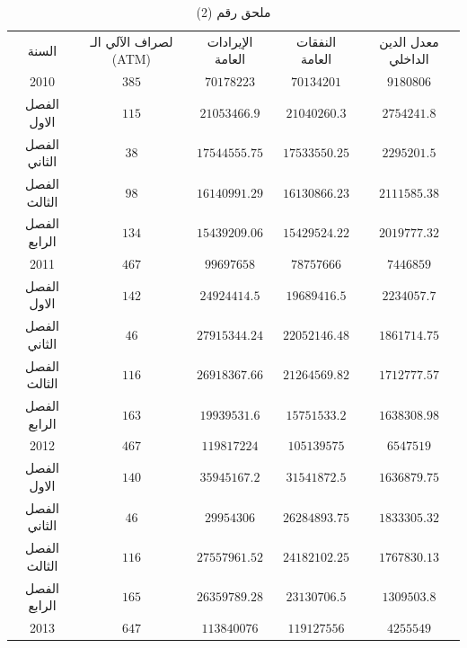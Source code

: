 \documentclass[10pt,a4paper]{report}
\begin{document}
	\begin{longtable}{|c|c|c|c|c|}
	\captionsetup{font=Large}
 \caption*{ملحق رقم (2)} \\
	\hline
\rowcolor[HTML]{DAE8FC} 
السنة        & لصراف الآلي الـ (ATM) & الإيرادات العامة & النفقات العامة & معدل الدين الداخلي \\ \hline
2010         & $385$                 & $70178223$       & $70134201$     & $9180806$          \\ \hline
الفصل الاول  & $115$                 & $21053466.9$     & $21040260.3$   & $2754241.8$        \\ \hline
الفصل الثاني & $38$                  & $17544555.75$    & $17533550.25$  & $2295201.5$        \\ \hline
الفصل الثالث & $98$                  & $16140991.29$    & $16130866.23$  & $2111585.38$       \\ \hline
الفصل الرابع & $134$                 & $15439209.06$    & $15429524.22$  & $2019777.32$       \\ \hline
2011         & $467$                 & $99697658$       & $78757666$     & $7446859$          \\ \hline
الفصل الاول  & $142$                 & $24924414.5$     & $19689416.5$   & $2234057.7$        \\ \hline
الفصل الثاني & $46$                  & $27915344.24$    & $22052146.48$  & $1861714.75$       \\ \hline
الفصل الثالث & $116$                 & $26918367.66$    & $21264569.82$  & $1712777.57$       \\ \hline
الفصل الرابع & $163$                 & $19939531.6$     & $15751533.2$   & $1638308.98$       \\ \hline
2012         & $467$                 & $119817224$      & $105139575$    & $6547519$          \\ \hline
الفصل الاول  & $140$                 & $35945167.2$     & $31541872.5$   & $1636879.75$       \\ \hline
الفصل الثاني & $46$                  & $29954306$       & $26284893.75$  & $1833305.32$       \\ \hline
الفصل الثالث & $116$                 & $27557961.52$    & $24182102.25$  & $1767830.13$       \\ \hline
الفصل الرابع & $165$                 & $26359789.28$    & $23130706.5$   & $1309503.8$        \\ \hline
2013         & $647$                 & $113840076$      & $119127556$    & $4255549$          \\ \hline

\end{longtable}
\end{document}
